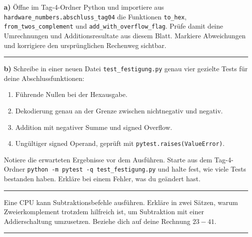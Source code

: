 \documentclass[10pt,a4paper]{article}
\newcommand{\block}[1]{\par\vspace{2mm}{\sffamily\large\bfseries #1}\par}
\newcommand{\code}[1]{\texttt{#1}}
\newcommand{\antwort}[1]{\par\vspace{#1}\hrule\vspace{3mm}}
\begin{document}
\block{8. Prüfen statt nur ausführen}
\textbf{a)} Öffne im Tag-4-Ordner Python und importiere aus
\code{hardware\_numbers.abschluss\_tag04} die Funktionen \code{to\_hex},
\code{from\_twos\_complement} und \code{add\_with\_overflow\_flag}.
Prüfe damit deine Umrechnungen und Additionsresultate aus diesem Blatt.
Markiere Abweichungen und korrigiere den ursprünglichen Rechenweg sichtbar.
\antwort{13mm}
\textbf{b)} Schreibe in einer neuen Datei \code{test\_festigung.py} genau vier
gezielte Tests für deine Abschlussfunktionen:
\begin{enumerate}
\item Führende Nullen bei der Hexausgabe.
\item Dekodierung genau an der Grenze zwischen nichtnegativ und negativ.
\item Addition mit negativer Summe und signed Overflow.
\item Ungültiger signed Operand, geprüft mit \code{pytest.raises(ValueError)}.
\end{enumerate}
Notiere die erwarteten Ergebnisse vor dem Ausführen. Starte aus dem
Tag-4-Ordner \code{python -m pytest -q test\_festigung.py} und halte fest,
wie viele Tests bestanden haben. Erkläre bei einem Fehler, was du geändert hast.
\antwort{16mm}

\block{9. Das Warum in eigenen Worten}
Eine CPU kann Subtraktionsbefehle ausführen. Erkläre in zwei Sätzen, warum
Zweierkomplement trotzdem hilfreich ist, um Subtraktion mit einer Addierschaltung
umzusetzen. Beziehe dich auf deine Rechnung $23-41$.
\antwort{18mm}
\end{document}

